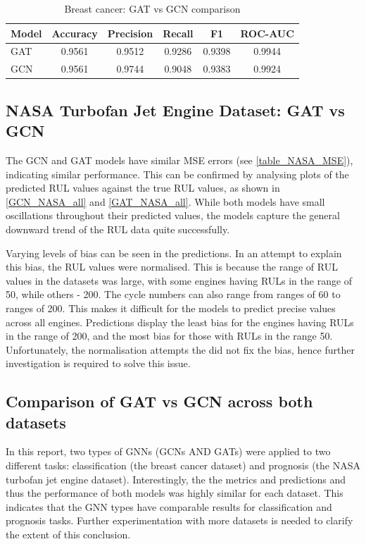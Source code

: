 \documentclass[12pt]{article}
\begin{document}
\begin{table}[H]
\centering
\caption{Breast cancer: GAT vs GCN comparison}
\begin{tabular}{|l|c|c|c|c|c|}
\hline
\textbf{Model} & \textbf{Accuracy} & \textbf{Precision} & \textbf{Recall} & \textbf{F1} & \textbf{ROC-AUC} \\
\hline
GAT & 0.9561 & 0.9512 & 0.9286 & 0.9398 & 0.9944 \\
GCN & 0.9561 & 0.9744 & 0.9048 & 0.9383 & 0.9924 \\
\hline
\end{tabular}

\end{table}

\subsection{NASA Turbofan Jet Engine Dataset: GAT vs GCN}
The GCN and GAT models have similar MSE errors (see \autoref{table_NASA_MSE}), indicating similar performance. This can be confirmed by analysing plots of the predicted RUL values against the true RUL values, as shown in \autoref{GCN_NASA_all} and \autoref{GAT_NASA_all}. While both models have small oscillations throughout their predicted values, the models capture the general downward trend of the RUL data quite successfully. 

Varying levels of bias can be seen in the predictions. In an attempt to explain this bias, the RUL values were normalised. This is because the range of RUL values in the datasets was large, with some engines having RULs in the range of 50, while others - 200. The cycle numbers can also range from ranges of 60 to ranges of 200. This makes it difficult for the models to predict precise values across all engines. Predictions display the least bias for the engines having RULs in the range of 200, and the most bias for those with RULs in the range 50. Unfortunately, the normalisation attempts the did not fix the bias, hence further investigation is required to solve this issue.

\subsection{Comparison of GAT vs GCN across both datasets}
In this report, two types of GNNs (GCNs AND GATs) were applied to two different tasks: classification (the breast cancer dataset) and prognosis (the NASA turbofan jet engine dataset). Interestingly, the the metrics and predictions and thus the performance of both models was highly similar for each dataset. This indicates that the GNN types have comparable results for classification and prognosis tasks. Further experimentation with more datasets is needed to clarify the extent of this conclusion.
\end{document}
